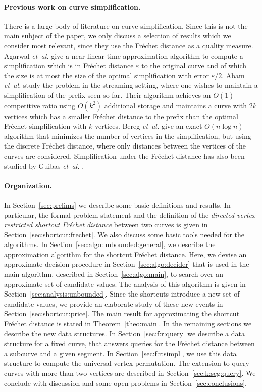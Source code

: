 \documentclass[12pt]{article}
\newcommand{\secref}[1]{Section~\ref{sec:#1}}
\newcommand{\thmref}[1]{Theorem~\ref{theo:#1}}
\newcommand{\etal}{\textit{et~al.}\xspace}
\newcommand{\Frechet}{Fr\'{e}c{h}e{}t\xspace}\providecommand{\Arr}{\mathop{\mathrm{\EuScript{A}}}}
\providecommand{\eps}{{\varepsilon}}\renewcommand{\Re}{{\rm I\!\hspace{-0.025em} R}}
\numberwithin{figure}{section}
\numberwithin{equation}{section}
\newcommand{\vrestricted}{vertex-restricted}
\newcommand{\asymmetric}{directed}
\begin{document}
\paragraph{Previous work on curve simplification.} There is a large
body of literature on curve simplification. Since this is not the main
subject of the paper, we only discuss a selection of results which we
consider most relevant, since they use the \Frechet distance as a
quality measure.  Agarwal \etal \cite{ahmw-nltaa-05} give a
near-linear time approximation algorithm to compute a simplification
which is in \Frechet distance $\eps$ to the original curve and of
which the size is at most the size of the optimal simplification with
error $\eps/2$.  Abam \etal \cite{abh-sals-10} study the problem in
the streaming setting, where one wishes to maintain a simplification
of the prefix seen so far.  Their algorithm achieves an $O(1)$
competitive ratio using $O(k^2)$ additional storage and maintains a
curve with $2k$ vertices which has a smaller \Frechet distance to the
prefix than the optimal \Frechet simplification with $k$ vertices.
Bereg \etal \cite{bjwyz-spcdfd-08} give an exact $O(n\log n)$
algorithm that minimizes the number of vertices in the simplification,
but using the discrete \Frechet distance, where only distances between
the vertices of the curves are considered. Simplification under the
\Frechet distance has also been studied by Guibas \etal
\cite{ghms-apsml-93}.


\paragraph{Organization.}

In \secref{prelims} we describe some basic definitions and results. In
particular, the formal problem statement and the definition of the
\emph{\asymmetric{} \vrestricted{} shortcut \Frechet distance} between
two curves is given in \secref{shortcut:frechet}.  We also discuss
some basic tools needed for the algorithms.
In \secref{algo:unbounded:general}, we describe the approximation
algorithm for the shortcut \Frechet distance.  Here, we devise an
approximate decision procedure in \secref{algo:decider} that is used
in the main algorithm, described in \secref{algo:main}, to search over
an approximate set of candidate values.  The analysis of this
algorithm is given in \secref{analysis:unbounded}.  Since the
shortcuts introduce a new set of candidate values, we provide an
elaborate study of these new events in \secref{shortcut:price}.  The
main result for approximating the shortcut \Frechet distance is stated
in \thmref{main}.  In the remaining sections we describe the new data
structures.  In \secref{f:r:query} we describe a data structure for a
fixed curve, that answers queries for the \Frechet distance between a
subcurve and a given segment.  In \secref{f:r:simpl}, we use this data
structure to compute the universal vertex permutation. The extension
to query curves with more than two vertices are described in
\secref{k:seg:query}.  We conclude with discussion and some open
problems in \secref{conclusions}.
\end{document}
